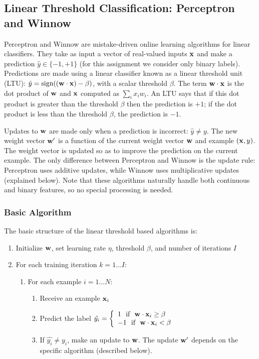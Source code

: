 \documentclass[11pt]{article}
\newcommand{\vw}{{\bf w}}
\newcommand{\vx}{{\bf x}}
\newcommand{\vxi}{{\bf x}_i}
\newcommand{\yh}{\hat{y}}
\newcommand{\yi}{y_i}
\begin{document}
\subsection{Linear Threshold Classification: Perceptron and Winnow}

Perceptron and Winnow are mistake-driven online learning algorithms for linear classifiers. They take as input a vector of real-valued inputs $\vx$ and make a prediction $\yh \in \{-1,+1\}$ (for this assignment we consider only binary labels). Predictions are made using a linear classifier known as a linear threshold unit (LTU): $\yh = \textrm{sign}((\vw \cdot \vx) - \beta)$, with a scalar threshold $\beta$. The term $\vw \cdot \vx$ is the dot product of $\vw$ and $\vx$ computed as $\sum_i x_i  w_i$. An LTU says that if this dot product is greater than the threshold $\beta$ then the prediction is $+1$; if the dot product is less than the threshold $\beta$, the prediction is $-1$.

Updates to $\vw$ are made only when a prediction is incorrect: $\yh \ne y$. The new weight vector $\vw'$ is a function of the current weight vector $\vw$ and example $(\vx, y)$. The weight vector is updated so as to improve the prediction on the current example. The only difference between Perceptron and Winnow is the update rule: Perceptron uses additive updates, while Winnow uses multiplicative updates (explained below). Note that these algorithms naturally handle both continuous and binary features, so no special processing is needed.

\subsubsection{Basic Algorithm}
\label{sec:algorithm}

The basic structure of the linear threshold based algorithms is:
\begin{enumerate}
\item Initialize $\vw$, set learning rate $\eta$, threshold $\beta$, and number of iterations $I$
\item For each training iteration $k = 1 \ldots I$:
	\begin{enumerate}
	\item For each example $i=1\ldots N$:
	\begin{enumerate}
		\item Receive an example $\vxi$
		\item  \label{prediction_rule} Predict the label $\hat{\yi}  =\left\{
		     \begin{array}{lr}
		       1 ~~  \textrm{if} ~~ \vw \cdot \vxi \ge \beta  \\
		       -1 ~~  \textrm{if} ~~ \vw \cdot \vxi < \beta  
		     \end{array}
		   \right.$
		\item \label{update_step} If  $\hat{\yi} \ne \yi$, make an update to $\vw$. The update $\vw'$ depends on the specific algorithm (described below).
		\end{enumerate}
	\end{enumerate}
\end{enumerate}
\end{document}
